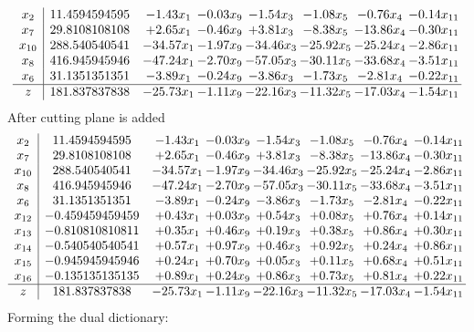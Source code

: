 \documentclass[8pt]{article}
\begin{document}
\[\begin{array}{c| c c@{\hskip 2pt} c@{\hskip 2pt} c@{\hskip 2pt} c@{\hskip 2pt} c@{\hskip 2pt} c@{\hskip 2pt} }
 x_{2}   &  11.4594594595 & -1.43 x_{1} & -0.03 x_{9} & -1.54 x_{3} & -1.08 x_{5} & -0.76 x_{4} & -0.14 x_{11}\\
 x_{7}   &  29.8108108108 & +  2.65 x_{1} & -0.46 x_{9} & +  3.81 x_{3} & -8.38 x_{5} & -13.86 x_{4} & -0.30 x_{11}\\
 x_{10}   &  288.540540541 & -34.57 x_{1} & -1.97 x_{9} & -34.46 x_{3} & -25.92 x_{5} & -25.24 x_{4} & -2.86 x_{11}\\
 x_{8}   &  416.945945946 & -47.24 x_{1} & -2.70 x_{9} & -57.05 x_{3} & -30.11 x_{5} & -33.68 x_{4} & -3.51 x_{11}\\
 x_{6}   &  31.1351351351 & -3.89 x_{1} & -0.24 x_{9} & -3.86 x_{3} & -1.73 x_{5} & -2.81 x_{4} & -0.22 x_{11}\\
\hline
z    &  181.837837838 & -25.73 x_{1} & -1.11 x_{9} & -22.16 x_{3} & -11.32 x_{5} & -17.03 x_{4} & -1.54 x_{11}\\
\end{array}\]
 After cutting plane is added 
\[\begin{array}{c| c c@{\hskip 2pt} c@{\hskip 2pt} c@{\hskip 2pt} c@{\hskip 2pt} c@{\hskip 2pt} c@{\hskip 2pt} }
 x_{2}   &  11.4594594595 & -1.43 x_{1} & -0.03 x_{9} & -1.54 x_{3} & -1.08 x_{5} & -0.76 x_{4} & -0.14 x_{11}\\
 x_{7}   &  29.8108108108 & +  2.65 x_{1} & -0.46 x_{9} & +  3.81 x_{3} & -8.38 x_{5} & -13.86 x_{4} & -0.30 x_{11}\\
 x_{10}   &  288.540540541 & -34.57 x_{1} & -1.97 x_{9} & -34.46 x_{3} & -25.92 x_{5} & -25.24 x_{4} & -2.86 x_{11}\\
 x_{8}   &  416.945945946 & -47.24 x_{1} & -2.70 x_{9} & -57.05 x_{3} & -30.11 x_{5} & -33.68 x_{4} & -3.51 x_{11}\\
 x_{6}   &  31.1351351351 & -3.89 x_{1} & -0.24 x_{9} & -3.86 x_{3} & -1.73 x_{5} & -2.81 x_{4} & -0.22 x_{11}\\
 x_{12}   &  -0.459459459459 & +  0.43 x_{1} & +  0.03 x_{9} & +  0.54 x_{3} & +  0.08 x_{5} & +  0.76 x_{4} & +  0.14 x_{11}\\
 x_{13}   &  -0.810810810811 & +  0.35 x_{1} & +  0.46 x_{9} & +  0.19 x_{3} & +  0.38 x_{5} & +  0.86 x_{4} & +  0.30 x_{11}\\
 x_{14}   &  -0.540540540541 & +  0.57 x_{1} & +  0.97 x_{9} & +  0.46 x_{3} & +  0.92 x_{5} & +  0.24 x_{4} & +  0.86 x_{11}\\
 x_{15}   &  -0.945945945946 & +  0.24 x_{1} & +  0.70 x_{9} & +  0.05 x_{3} & +  0.11 x_{5} & +  0.68 x_{4} & +  0.51 x_{11}\\
 x_{16}   &  -0.135135135135 & +  0.89 x_{1} & +  0.24 x_{9} & +  0.86 x_{3} & +  0.73 x_{5} & +  0.81 x_{4} & +  0.22 x_{11}\\
\hline
z    &  181.837837838 & -25.73 x_{1} & -1.11 x_{9} & -22.16 x_{3} & -11.32 x_{5} & -17.03 x_{4} & -1.54 x_{11}\\
\end{array}\]
Forming the dual dictionary:
\end{document}
